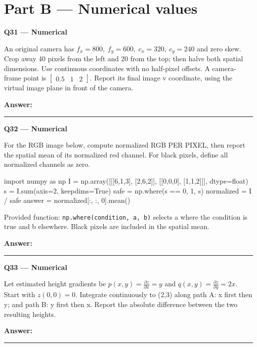 \documentclass[11pt,a4paper]{article}
\begin{document}
\par\vspace{12pt}
\clearpage\section*{Part B — Numerical values}
\begin{minipage}{\linewidth}
\textbf{Q31 — Numerical}\par\smallskip
An original camera has \(f_x=800,\;f_y=600,\;c_x=320,\;c_y=240\) and zero skew. Crop away 40 pixels from the left and 20 from the top; then halve both spatial dimensions. Use continuous coordinates with no half-pixel offsets. A camera-frame point is \(\begin{bmatrix}0.5&1&2\end{bmatrix}\). Report its final image v coordinate,\allowbreak{} using the virtual image plane in front of the camera.
\par\medskip\textbf{Answer:} \rule{55mm}{0.4pt}
\end{minipage}
\par\vspace{12pt}
\begin{minipage}{\linewidth}
\textbf{Q32 — Numerical}\par\smallskip
For the RGB image below,\allowbreak{} compute normalized RGB PER PIXEL,\allowbreak{} then report the spatial mean of its normalized red channel. For black pixels,\allowbreak{} define all normalized channels as zero.


\begin{Code}
import numpy as np
I = np.array([[[6,1,3], [2,6,2]],
              [[0,0,0], [1,1,2]]], dtype=float)
s = I.sum(axis=2, keepdims=True)
safe = np.where(s == 0, 1, s)
normalized = I / safe
answer = normalized[:, :, 0].mean()
\end{Code}


Provided function: \texttt{np.where(condition,\allowbreak{} a,\allowbreak{} b)} selects a where the condition is true and b elsewhere. Black pixels are included in the spatial mean.
\par\medskip\textbf{Answer:} \rule{55mm}{0.4pt}
\end{minipage}
\par\vspace{12pt}
\begin{minipage}{\linewidth}
\textbf{Q33 — Numerical}\par\smallskip
Let estimated height gradients be \(p(x,y)=\frac{\partial z}{\partial x}=y\) and \(q(x,y)=\frac{\partial z}{\partial y}=2x\). Start with \(z(0,0)=0\). Integrate continuously to (2,\allowbreak{}3) along path A: x first then y; and path B: y first then x. Report the absolute difference between the two resulting heights.
\par\medskip\textbf{Answer:} \rule{55mm}{0.4pt}
\end{minipage}
\end{document}
